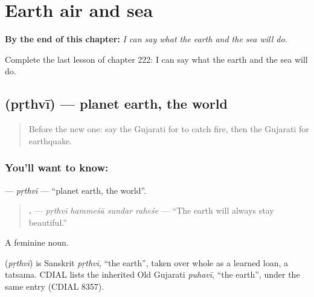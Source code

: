 
\chapter{Earth air and sea}
\label{ch:gu-earth-air-and-sea}

\begin{chapteropening}
\textbf{By the end of this chapter:} \emph{I can say what the earth and the sea will do.}

Complete the last lesson of chapter 222: I can say what the earth and the sea will do.
\end{chapteropening}

\section[\texorpdfstring{\gu{પૃથ્વી} (pṛthvī)}{પૃથ્વી (pṛthvī)}]{ (pṛthvī) — planet earth, the world}

\label{lesson:GU-C222-prthvi}



\begin{quote}
Before the new one: say the Gujarati for to catch fire, then the Gujarati for earthquake.
\end{quote}

\subsection*{You'll want to know: }
\textbf{} — \emph{pṛthvī} — \textquotedblleft{}planet earth, the world\textquotedblright{}.

\begin{quote}
\textbf{   .} — \emph{pṛthvī hammeśā sundar raheśe} — \textquotedblleft{}The earth will always stay beautiful.\textquotedblright{}
\end{quote}

A feminine noun.

\begin{cousinweb}
\textbf{} (\emph{pṛthvī}) is Sanskrit \emph{pṛthvī}, \textquotedblleft{}the earth\textquotedblright{}, taken over whole as a learned loan, a tatsama. CDIAL lists the inherited Old Gujarati \emph{puhavī}, \textquotedblleft{}the earth\textquotedblright{}, under the same entry (CDIAL 8357).
\end{cousinweb}

